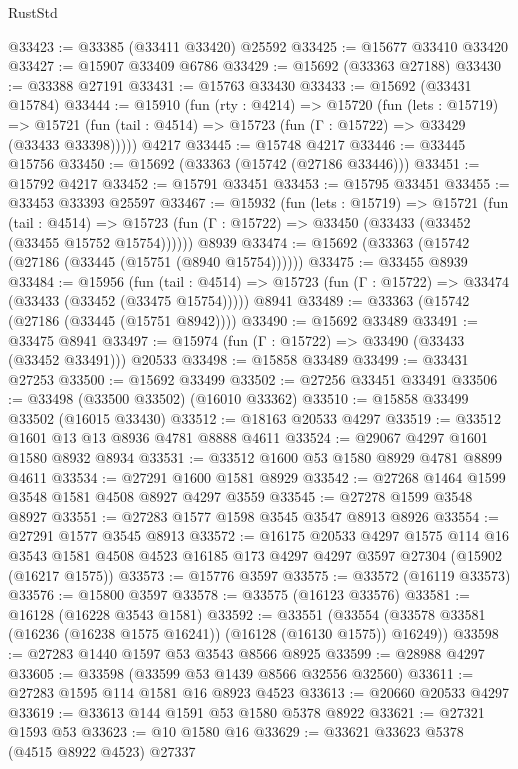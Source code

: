 \begin{lexlean}{RustStd}
\begin{coremodule}
@33423 := @33385 (@33411 @33420) @25592
@33425 := @15677 @33410 @33420
@33427 := @15907 @33409 @6786
@33429 := @15692 (@33363 @27188)
@33430 := @33388 @27191
@33431 := @15763 @33430
@33433 := @15692 (@33431 @15784)
@33444 := @15910
    (fun (rty : @4214) =>
    @15720
      (fun (lets : @15719) =>
      @15721 (fun (tail : @4514) => @15723 (fun (Γ : @15722) => @33429 (@33433 @33398)))))
    @4217
@33445 := @15748 @4217
@33446 := @33445 @15756
@33450 := @15692 (@33363 (@15742 (@27186 @33446)))
@33451 := @15792 @4217
@33452 := @15791 @33451
@33453 := @15795 @33451
@33455 := @33453 @33393 @25597
@33467 := @15932
    (fun (lets : @15719) =>
    @15721
      (fun (tail : @4514) =>
      @15723 (fun (Γ : @15722) => @33450 (@33433 (@33452 (@33455 @15752 @15754))))))
    @8939
@33474 := @15692 (@33363 (@15742 (@27186 (@33445 (@15751 (@8940 @15754))))))
@33475 := @33455 @8939
@33484 := @15956
    (fun (tail : @4514) => @15723 (fun (Γ : @15722) => @33474 (@33433 (@33452 (@33475 @15754)))))
    @8941
@33489 := @33363 (@15742 (@27186 (@33445 (@15751 @8942))))
@33490 := @15692 @33489
@33491 := @33475 @8941
@33497 := @15974 (fun (Γ : @15722) => @33490 (@33433 (@33452 @33491))) @20533
@33498 := @15858 @33489
@33499 := @33431 @27253
@33500 := @15692 @33499
@33502 := @27256 @33451 @33491
@33506 := @33498 (@33500 @33502) (@16010 @33362)
@33510 := @15858 @33499 @33502 (@16015 @33430)
@33512 := @18163 @20533 @4297
@33519 := @33512 @1601 @13 @13 @8936 @4781 @8888 @4611
@33524 := @29067 @4297 @1601 @1580 @8932 @8934
@33531 := @33512 @1600 @53 @1580 @8929 @4781 @8899 @4611
@33534 := @27291 @1600 @1581 @8929
@33542 := @27268 @1464 @1599 @3548 @1581 @4508 @8927 @4297 @3559
@33545 := @27278 @1599 @3548 @8927
@33551 := @27283 @1577 @1598 @3545 @3547 @8913 @8926
@33554 := @27291 @1577 @3545 @8913
@33572 := @16175
    @20533
    @4297
    @1575
    @114
    @16
    @3543
    @1581
    @4508
    @4523
    @16185
    @173
    @4297
    @4297
    @3597
    @27304
    (@15902 (@16217 @1575))
@33573 := @15776 @3597
@33575 := @33572 (@16119 @33573)
@33576 := @15800 @3597
@33578 := @33575 (@16123 @33576)
@33581 := @16128 (@16228 @3543 @1581)
@33592 := @33551
    (@33554 (@33578 @33581 (@16236 (@16238 @1575 @16241)) (@16128 (@16130 @1575)) @16249))
@33598 := @27283 @1440 @1597 @53 @3543 @8566 @8925
@33599 := @28988 @4297
@33605 := @33598 (@33599 @53 @1439 @8566 @32556 @32560)
@33611 := @27283 @1595 @114 @1581 @16 @8923 @4523
@33613 := @20660 @20533 @4297
@33619 := @33613 @144 @1591 @53 @1580 @5378 @8922
@33621 := @27321 @1593 @53
@33623 := @10 @1580 @16
@33629 := @33621 @33623 @5378 (@4515 @8922 @4523) @27337

\end{coremodule}
\end{lexlean}
